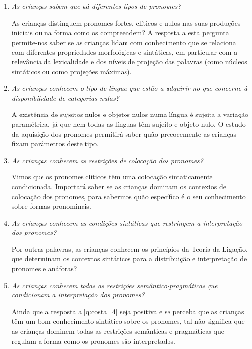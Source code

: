 \documentclass[output=paper]{LSP/langsci}
\begin{document}
\begin{enumerate}[label=Q\arabic*]
\item\label{q:costa_1}  \textit{As crianças sabem que há diferentes tipos de pronomes?}

As crianças distinguem pronomes fortes, clíticos e nulos nas suas produções iniciais ou na forma como os compreendem? A resposta a esta pergunta permite-nos saber se as crianças lidam com conhecimento que se relaciona com diferentes propriedades morfológicas e sintáticas, em particular com a relevância da lexicalidade e dos níveis de projeção das palavras (como núcleos sintáticos ou como projeções máximas).

\item\label{q:costa_2} \textit{As crianças conhecem o tipo de língua que estão a adquirir no que concerne à disponibilidade de categorias nulas?}

A existência de sujeitos nulos e objetos nulos numa língua é sujeita a variação paramétrica, já que nem todas as línguas têm sujeito e objeto nulo. O estudo da aquisição dos pronomes permitirá saber quão precocemente as crianças fixam parâmetros deste tipo.

\item\label{q:costa_3} \textit{As crianças conhecem as restrições de colocação dos pronomes?}

Vimos que os pronomes clíticos têm uma colocação sintaticamente condicionada. Importará saber se as crianças dominam os contextos de colocação dos pronomes, para sabermos quão específico é o seu conhecimento sobre formas pronominais.

\item\label{q:costa_4} \textit{As crianças conhecem as condições sintáticas que restringem a interpretação dos pronomes?}

Por outras palavras, as crianças conhecem os princípios da Teoria da Ligação, que determinam os contextos sintáticos para a distribuição e interpretação de pronomes e anáforas?

\item\label{q:costa_5} \textit{As crianças conhecem todas as restrições se\-mân\-ti\-co-prag\-má\-ti\-cas que condicionam a interpretação dos pronomes?}

Ainda que a resposta a \ref{q:costa_4} seja positiva e se perceba que as crianças têm um bom conhecimento sintático sobre os pronomes, tal não significa que as crianças dominem todas as restrições semânticas e pragmáticas que regulam a forma como os pronomes são interpretados.
\end{enumerate}
\end{document}

